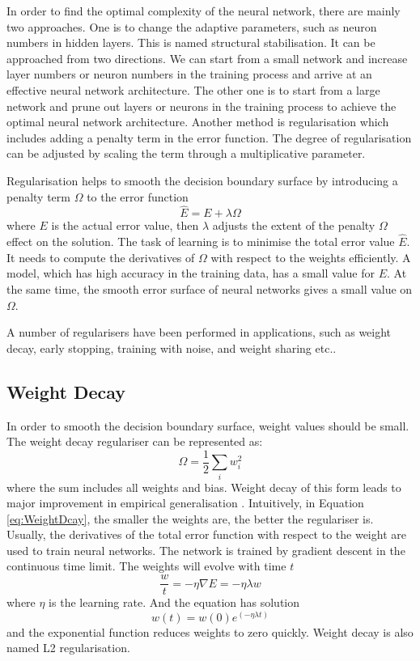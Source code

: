 In order to find the optimal complexity of the neural network, there are mainly two approaches. One is to change the adaptive parameters, such as neuron numbers in hidden layers. This is named structural stabilisation. It can be approached from two directions. We can start from a small network and increase layer numbers or neuron numbers in the training process and arrive at an effective neural network architecture. The other one is to start from a large network and prune out layers or neurons in the training process to achieve the optimal neural network architecture. Another method is regularisation which includes adding a penalty term in the error function. The degree of regularisation can be adjusted by scaling the term through a multiplicative parameter.

Regularisation helps to smooth the decision boundary surface by introducing a penalty term $\Omega$ to the error function
\begin{equation}\label{eq:Regularization}
\hat{E} = E + \lambda\Omega
\end{equation}
where $E$ is the actual error value, then $\lambda$ adjusts the extent of the penalty $\Omega$ effect on the solution. The task of learning is to minimise the total error value $\hat{E}$. It needs to compute the derivatives of $\Omega$ with respect to the weights efficiently. A model, which has high accuracy in the training data, has a small value for $E$. At the same time, the smooth error surface of neural networks gives a small value on $\Omega$.

A number of regularisers have been performed in applications, such as weight decay, early stopping, training with noise, and weight sharing etc..

\subsection{Weight Decay}

In order to smooth the decision boundary surface, weight values should be small. The weight decay regulariser can be represented as:
\begin{equation}\label{eq:WeightDcay}
\Omega = \frac{1}{2} \sum_i w_{i}^2
\end{equation}
where the sum includes all weights and bias. Weight decay of this form leads to major improvement in empirical generalisation \citep{hinton1987learning}. Intuitively, in Equation \ref{eq:WeightDcay}, the smaller the weights are, the better the regulariser is. Usually, the derivatives of the total error function with respect to the weight are used to train neural networks. The network is trained by gradient descent in the continuous time limit. The weights will evolve with time $t$
\begin{equation}\label{eq:WeightDecayTime}
\frac{w}{t} = -\eta\nabla E = -\eta\lambda w
\end{equation}
where $\eta$ is the learning rate. And the equation has solution
\begin{equation}\label{eq:WeightDecaySolution}
w(t) = w(0)e^{(-\eta\lambda t)}
\end{equation}
and the exponential function reduces weights to zero quickly. Weight decay is also named L2 regularisation.


